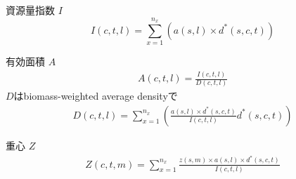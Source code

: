 \documentclass[11pt]{article}
\begin{document}
資源量指数 $I$
\begin{dmath}
I(c,t,l) = \sum_{x=1}^{n_x}(a(s,l) \times d^*(s,c,t)) 
\end{dmath}
\hrulefill

有効面積 $A$
\begin{eqnarray}
A(c,t,l) = \frac{I(c,t,l)}{D(c,t,l)}
\end{eqnarray}
\hspace{1.5cm}$D$はbiomass-weighted average densityで
\begin{eqnarray}
D(c,t,l) = \sum_{x=1}^{n_x} \left( \frac{a(s,l) \times d^*(s,c,t)}{I(c,t,l)} d^*(s,c,t) \right)
\end{eqnarray}
\hrulefill

重心 $Z$
\begin{eqnarray}
Z(c,t,m) = \sum_{x = 1}^{n_x}\frac{z(s,m) \times a(s,l) \times d^{*}(s,c,t)} {I(c,t,l)}
\end{eqnarray}

\end{document}
